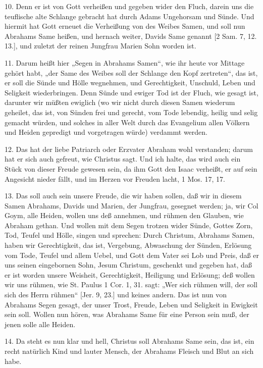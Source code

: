 10. Denn er ist von Gott verheißen und gegeben wider den Fluch, darein uns die teuflische alte Schlange gebracht hat durch Adams Ungehorsam und Sünde. Und hiermit hat Gott erneuet die Verheißung von des Weibes Samen, und soll nun Abrahams Same heißen, und hernach weiter, Davids Same genannt [2 Sam. 7, 12. 13.], und zuletzt der reinen Jungfrau Marien Sohn worden ist.

11. Darum heißt hier „Segen in Abrahams Samen“, wie ihr heute vor Mittage gehört habt, „der Same des Weibes soll der Schlange den Kopf zertreten“, das ist, er soll die Sünde und Hölle wegnehmen, und Gerechtigkeit, Unschuld, Leben und Seligkeit wiederbringen. Denn Sünde und ewiger Tod ist der Fluch, wie gesagt ist, darunter wir müßten ewiglich (wo wir nicht durch diesen Samen wiederum geheilet, das ist, von Sünden frei und gerecht, vom Tode lebendig, heilig und selig gemacht würden, und solches in aller Welt durch das Evangelium allen Völkern und Heiden gepredigt und vorgetragen würde) verdammt werden.

12. Das hat der liebe Patriarch oder Erzvater Abraham wohl verstanden; darum hat er sich auch gefreut, wie Christus sagt. Und ich halte, das wird auch ein Stück von dieser Freude gewesen sein, da ihm Gott den Isaac verheißt, er auf sein Angesicht nieder fällt, und im Herzen vor Freuden lacht, 1 Mos. 17, 17.

13. Das soll auch sein unsere Freude, die wir haben sollen, daß wir in diesem Samen Abrahams, Davids und Marien, der Jungfrau, gesegnet werden; ja, wir Col Goym, alle Heiden, wollen uns deß annehmen, und rühmen den Glauben, wie Abraham gethan. Und wollen mit dem Segen trotzen wider Sünde, Gottes Zorn, Tod, Teufel und Hölle, singen und sprechen: Durch Christum, Abrahams Samen, haben wir Gerechtigkeit, das ist, Vergebung, Abwaschung der Sünden, Erlösung vom Tode, Teufel und allem Uebel, und Gott dem Vater sei Lob und Preis, daß er uns seinen eingebornen Sohn, Jesum Christum, geschenkt und gegeben hat, daß er ist worden unsere Weisheit, Gerechtigkeit, Heiligung und Erlösung; deß wollen wir uns rühmen, wie St. Paulus 1 Cor. 1, 31. sagt: „Wer sich rühmen will, der soll sich des Herrn rühmen“ [Jer. 9, 23.] und keines andern. Das ist nun von Abrahams Segen gesagt, der unser Trost, Freude, Leben und Seligkeit in Ewigkeit sein soll. Wollen nun hören, was Abrahams Same für eine Person sein muß, der jenen solle alle Heiden.

14. Da steht es nun klar und hell, Christus soll Abrahams Same sein, das ist, ein recht
natürlich Kind und lauter Mensch, der Abrahams Fleisch und Blut an sich habe.

